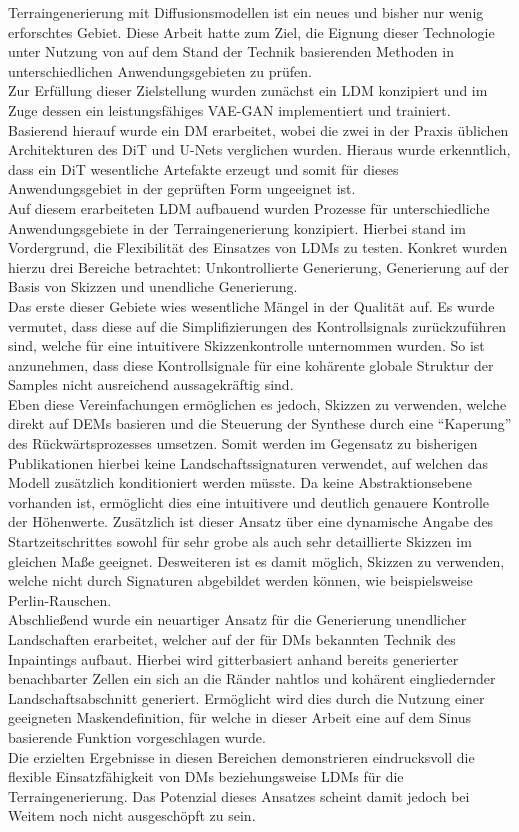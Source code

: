Terraingenerierung mit Diffusionsmodellen ist ein neues und bisher nur wenig erforschtes Gebiet. Diese Arbeit hatte zum Ziel, die Eignung dieser Technologie unter Nutzung von auf dem Stand der Technik basierenden Methoden in unterschiedlichen Anwendungsgebieten zu prüfen. \\
Zur Erfüllung dieser Zielstellung wurden zunächst ein \ac{LDM} konzipiert und im Zuge dessen ein leistungsfähiges VAE-GAN implementiert und trainiert. Basierend hierauf wurde ein \ac{DM} erarbeitet, wobei die zwei in der Praxis üblichen Architekturen des \ac{DiT} und U-Nets verglichen wurden. Hieraus wurde erkenntlich, dass ein \ac{DiT} wesentliche Artefakte erzeugt und somit für dieses Anwendungsgebiet in der geprüften Form ungeeignet ist. \\
Auf diesem erarbeiteten \ac{LDM} aufbauend wurden Prozesse für unterschiedliche Anwendungsgebiete in der Terraingenerierung konzipiert. Hierbei stand im Vordergrund, die Flexibilität des Einsatzes von \ac{LDM}s zu testen. Konkret wurden hierzu drei Bereiche betrachtet: Unkontrollierte Generierung, Generierung auf der Basis von Skizzen und unendliche Generierung. \\
Das erste dieser Gebiete wies wesentliche Mängel in der Qualität auf. Es wurde vermutet, dass diese auf die Simplifizierungen des Kontrollsignals zurückzuführen sind, welche für eine intuitivere Skizzenkontrolle unternommen wurden. So ist anzunehmen, dass diese Kontrollsignale für eine kohärente globale Struktur der Samples nicht ausreichend aussagekräftig sind. \\
Eben diese Vereinfachungen ermöglichen es jedoch, Skizzen zu verwenden, welche direkt auf \ac{DEM}s basieren und die Steuerung der Synthese durch eine \enquote{Kaperung} des Rückwärtsprozesses umsetzen. Somit werden im Gegensatz zu bisherigen Publikationen hierbei keine Landschaftssignaturen verwendet, auf welchen das Modell zusätzlich konditioniert werden müsste. Da keine Abstraktionsebene vorhanden ist, ermöglicht dies eine intuitivere und deutlich genauere Kontrolle der Höhenwerte. Zusätzlich ist dieser Ansatz über eine dynamische Angabe des Startzeitschrittes sowohl für sehr grobe als auch sehr detaillierte Skizzen im gleichen Maße geeignet. Desweiteren ist es damit möglich, Skizzen zu verwenden, welche nicht durch Signaturen abgebildet werden können, wie beispielsweise Perlin-Rauschen. \\
Abschließend wurde ein neuartiger Ansatz für die Generierung unendlicher Landschaften erarbeitet, welcher auf der für \ac{DM}s bekannten Technik des Inpaintings aufbaut. Hierbei wird gitterbasiert anhand bereits generierter benachbarter Zellen ein sich an die Ränder nahtlos und kohärent eingliedernder Landschaftsabschnitt generiert. Ermöglicht wird dies durch die Nutzung einer geeigneten Maskendefinition, für welche in dieser Arbeit eine auf dem Sinus basierende Funktion vorgeschlagen wurde. \\
Die erzielten Ergebnisse in diesen Bereichen demonstrieren eindrucksvoll die flexible Einsatzfähigkeit von \ac{DM}s beziehungsweise \ac{LDM}s für die Terraingenerierung. Das Potenzial dieses Ansatzes scheint damit jedoch bei Weitem noch nicht ausgeschöpft zu sein.


